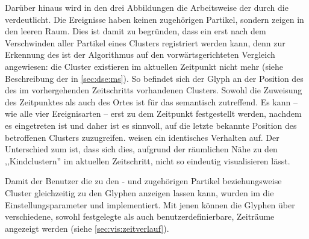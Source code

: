Darüber hinaus wird in den drei Abbildungen die Arbeitsweise der  durch die  verdeutlicht. Die Ereignisse haben keinen zugehörigen Partikel, sondern zeigen in den leeren Raum. Dies ist damit zu begründen, dass ein  erst nach dem Verschwinden aller Partikel eines Clusters registriert werden kann, denn zur Erkennung des  ist der Algorithmus auf den vorwärtsgerichteten Vergleich angewiesen: die Cluster existieren im aktuellen Zeitpunkt nicht mehr (siehe Beschreibung der  in \autoref{sec:dse:ms}). So befindet sich der Glyph an der Position des  des im vorhergehenden Zeitschritts vorhandenen Clusters. Sowohl die Zuweisung des Zeitpunktes als auch des Ortes ist für das  semantisch zutreffend. Es kann -- wie alle vier Ereignisarten -- erst zu dem Zeitpunkt festgestellt werden, nachdem es eingetreten ist und daher ist es sinnvoll, auf die letzte bekannte Position des betroffenen Clusters zuzugreifen.  weisen ein identisches Verhalten auf. Der Unterschied zum  ist, dass sich dies, aufgrund der räumlichen Nähe zu den ,,Kindclustern'' im aktuellen Zeitschritt, nicht so eindeutig visualisieren lässt.

Damit der Benutzer die zu den - und  zugehörigen Partikel beziehungsweise Cluster gleichzeitig zu den Glyphen anzeigen lassen kann, wurden im  die Einstellungsparameter  und  implementiert. Mit jenen können die Glyphen über verschiedene, sowohl festgelegte als auch benutzerdefinierbare, Zeiträume angezeigt werden (siehe \autoref{sec:vis:zeitverlauf}).

